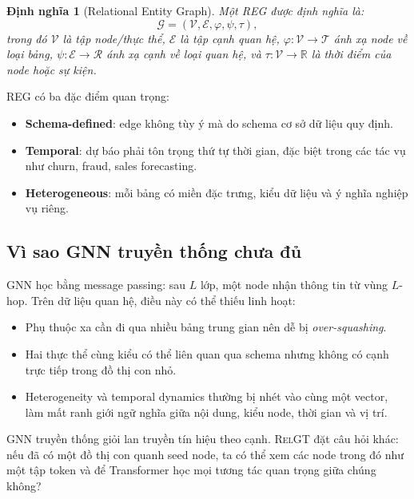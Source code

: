 \documentclass[12pt,a4paper]{article}
\newtheorem{definition}{Định nghĩa}[section]
\newcommand{\RelGT}{\textsc{RelGT}}
\newcommand{\REG}{\textsc{REG}}
\begin{document}
\begin{definition}[Relational Entity Graph]
Một \REG{} được định nghĩa là:
\[
  \mathcal{G}=(\mathcal{V},\mathcal{E},\varphi,\psi,\tau),
\]
trong đó $\mathcal{V}$ là tập node/thực thể, $\mathcal{E}$ là tập cạnh quan hệ,
$\varphi:\mathcal{V}\rightarrow\mathcal{T}$ ánh xạ node về loại bảng,
$\psi:\mathcal{E}\rightarrow\mathcal{R}$ ánh xạ cạnh về loại quan hệ, và
$\tau:\mathcal{V}\rightarrow\mathbb{R}$ là thời điểm của node hoặc sự kiện.
\end{definition}

\REG{} có ba đặc điểm quan trọng:
\begin{itemize}
  \item \textbf{Schema-defined}: edge không tùy ý mà do schema cơ sở dữ liệu
        quy định.
  \item \textbf{Temporal}: dự báo phải tôn trọng thứ tự thời gian, đặc biệt
        trong các tác vụ như churn, fraud, sales forecasting.
  \item \textbf{Heterogeneous}: mỗi bảng có miền đặc trưng, kiểu dữ liệu và
        ý nghĩa nghiệp vụ riêng.
\end{itemize}

\subsection{Vì sao GNN truyền thống chưa đủ}

GNN học bằng message passing: sau $L$ lớp, một node nhận thông tin từ vùng
$L$-hop. Trên dữ liệu quan hệ, điều này có thể thiếu linh hoạt:
\begin{itemize}
  \item Phụ thuộc xa cần đi qua nhiều bảng trung gian nên dễ bị \emph{over-squashing}.
  \item Hai thực thể cùng kiểu có thể liên quan qua schema nhưng không có cạnh
        trực tiếp trong đồ thị con nhỏ.
  \item Heterogeneity và temporal dynamics thường bị nhét vào cùng một vector,
        làm mất ranh giới ngữ nghĩa giữa nội dung, kiểu node, thời gian và vị trí.
\end{itemize}

\begin{insightbox}
GNN truyền thống giỏi lan truyền tín hiệu theo cạnh. \RelGT{} đặt câu hỏi khác:
nếu đã có một đồ thị con quanh seed node, ta có thể xem các node trong đó như
một tập token và để Transformer học mọi tương tác quan trọng giữa chúng không?
\end{insightbox}
\end{document}
